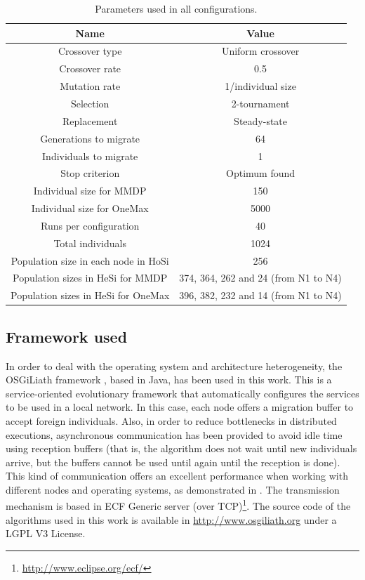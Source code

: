 \documentclass[final,1p,times]{elsarticle}
\begin{document}
\begin{table}
\centering
\caption{Parameters used in all configurations.}
\begin{tabular}{|c|c|} \hline
Name & Value\\ \hline

Crossover type & Uniform crossover \\ \hline
Crossover rate & 0.5\\ \hline
Mutation rate & 1/individual size\\ \hline
Selection & 2-tournament \\ \hline
Replacement & Steady-state\\ \hline
Generations to migrate & 64 \\ \hline
Individuals to migrate & 1 \\ \hline
Stop criterion & Optimum found \\ \hline
Individual size for MMDP & 150 \\ \hline
Individual size for OneMax & 5000 \\ \hline
Runs per configuration & 40 \\ \hline
\hline
Total individuals & 1024\\ \hline \hline
Population size in each node in HoSi & 256  \\ \hline
Population sizes in HeSi for MMDP & 374, 364, 262 and 24 (from N1 to N4)\\ \hline
Population sizes in HeSi for OneMax & 396,  382, 232 and 14 (from N1 to N4)\\ \hline
\hline\end{tabular}
\label{table:parameters}
\end{table}



\subsection{Framework used}
In order to deal with the operating system and architecture heterogeneity, the OSGiLiath framework \cite{SOASOCO}, based in Java, has been used in this work. This is a service-oriented evolutionary framework that automatically configures the services to be used in a local network. In this case, each node offers a migration buffer to accept foreign individuals. Also, in order to reduce bottlenecks in distributed executions, asynchronous communication has been provided to avoid idle time using reception buffers (that is, the algorithm does not wait until new individuals arrive, but the buffers cannot be used until again until the reception is done). This kind of communication offers an excellent performance when working with different nodes and operating systems, as demonstrated in \cite{HETEROGENEOUSHARD}. The transmission mechanism is based in ECF Generic server (over TCP)\footnote{\url{http://www.eclipse.org/ecf/}}.  The source code of the algorithms used in this work is available in \url{http://www.osgiliath.org} under a LGPL V3 License. 
\end{document}
